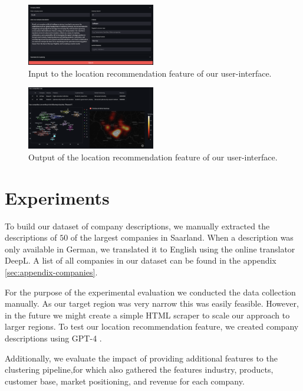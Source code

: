 \documentclass[conference]{IEEEtran}
\begin{document}
\begin{figure}[H]
	\centering
	\includegraphics[width=0.5\textwidth]{figures/location_recommendation_input.png}
	\caption{Input to the location recommendation feature of our user-interface.}
	\label{fig:location-recommendation-input}
\end{figure}
\begin{figure}[H]
	\centering
	\includegraphics[width=0.5\textwidth]{figures/location_recommendation_output.png}
	\caption{Output of the location recommendation feature of our user-interface.}
	\label{fig:location-recommendation-output}
\end{figure}

\section{Experiments}
To build our dataset of company descriptions, we manually extracted the descriptions of $50$ of the largest companies in Saarland. When a description was only available in German, we translated it to English using the online translator DeepL. A list of all companies in our dataset can be found in the appendix \ref{sec:appendix-companies}.

For the purpose of the experimental evaluation we conducted the data collection manually. As our target region was very narrow this was easily feasible. However, in the future we might create a simple HTML scraper to scale our approach to larger regions. To test our location recommendation feature, we created company descriptions using GPT-4 \cite{chatgpt}.

Additionally, we evaluate the impact of providing additional features to the clustering pipeline,for which also gathered the features industry, products, customer base, market positioning, and revenue for each company.
\end{document}
